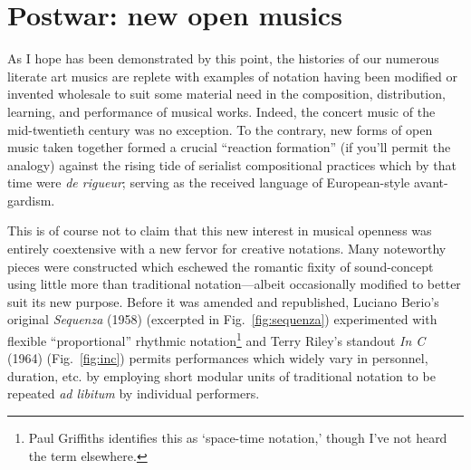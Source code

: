 
        
    
    \section[Postwar: new open musics]{Postwar: new open musics}

    As I hope has been demonstrated by this point, the histories of our numerous literate art musics are replete with examples of notation having been modified or invented wholesale to suit some material need in the composition, distribution, learning, and performance of musical works. Indeed, the concert music of the mid-twentieth century was no exception. To the contrary, new forms of open music taken together formed a crucial ``reaction formation'' (if you'll permit the analogy) against the rising tide of serialist compositional practices which by that time were \textit{de rigueur}; serving as the received language of European-style avant-gardism.\autocite[14--5]{Taruskin_2009d}

    This is of course not to claim that this new interest in musical openness was entirely coextensive with a new fervor for creative notations. Many noteworthy pieces were constructed which eschewed the romantic fixity of sound-concept using little more than traditional notation---albeit occasionally modified to better suit its new purpose. Before it was amended and republished, Luciano Berio's original \textit{Sequenza} (1958) (excerpted in Fig.~\ref{fig:sequenza}) experimented with flexible ``proportional'' rhythmic notation\footnote{Paul Griffiths identifies this as `space-time notation,' though I've not heard the term elsewhere.} and Terry Riley's standout \textit{In C} (1964) (Fig.~\ref{fig:inc}) permits performances which widely vary in personnel, duration, etc. by employing short modular units of traditional notation to be repeated \textit{ad libitum} by individual performers.

